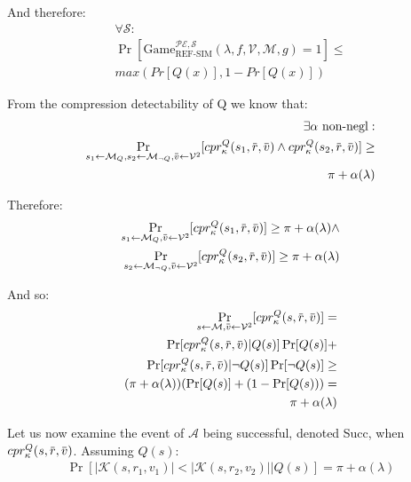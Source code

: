 \documentclass[conference, letterpaper, 10pt]{IEEEtran}
\newcommand{\overbar}[1]{\mkern 1.5mu\overline{\mkern-1.5mu#1\mkern-1.5mu}\mkern 1.5mu}
\begin{document}
\begin{IEEEproof}
And therefore:
\begin{align*}
    \forall \mathcal{S}:\\
    \Pr[
        \text{Game}_{\text{REF-SIM}}^{\mathcal{PE},\mathcal{S}}
        (\lambda, f, \mathcal{V}, \mathcal{M}, g) = 1
    ]
    \leq\\
    max(Pr[Q(x)], 1 - Pr[Q(x)])
\end{align*}

From the compression detectability of Q we know that:
\begin{align*}
    \exists \alpha \text{ non-negl}:\\
    \Pr_{s_1 \leftarrow \mathcal{M}_Q,
         s_2 \leftarrow \mathcal{M}_{\lnot Q},
         \overbar{v} \leftarrow \mathcal{V}^2}
         [cpr^Q_{\kappa}(s_1, \overbar{r}, \overbar{v}) \land
          cpr^Q_{\kappa}(s_2, \overbar{r}, \overbar{v})]
    \geq\\
    \pi + \alpha(\lambda)
\end{align*}

Therefore:
\begin{align*}
    \Pr_{s_1 \leftarrow \mathcal{M}_Q,
         \overbar{v} \leftarrow \mathcal{V}^2}
         [cpr^Q_{\kappa}(s_1, \overbar{r}, \overbar{v})]
    \geq
    \pi + \alpha(\lambda) \land\\
    \Pr_{s_2 \leftarrow \mathcal{M}_{\lnot Q},
         \overbar{v} \leftarrow \mathcal{V}^2}
         [cpr^Q_{\kappa}(s_2, \overbar{r}, \overbar{v})]
    \geq
    \pi + \alpha(\lambda)
\end{align*}

And so:
\begin{align*}
    \Pr_{s \leftarrow \mathcal{M},
         \overbar{v} \leftarrow \mathcal{V}^2}
         [cpr^Q_{\kappa}(s, \overbar{r}, \overbar{v})]
    =\\
    \Pr[cpr^Q_{\kappa}(s, \overbar{r}, \overbar{v})|Q(s)]\Pr[Q(s)]
    +\\
    \Pr[cpr^Q_{\kappa}(s, \overbar{r}, \overbar{v})|\lnot Q(s)]\Pr[\lnot Q(s)]
    \geq\\
    (\pi + \alpha(\lambda))(\Pr[Q(s)] + (1 - \Pr[Q(s)))
    =\\
    \pi + \alpha(\lambda)
\end{align*}

Let us now examine the event of $\mathcal{A}$ being successful, denoted Succ,
when $cpr^Q_{\kappa}(s, \overbar{r}, \overbar{v})$. Assuming $Q(s)$:
\begin{align*}
    \Pr[|\mathcal{K}(s, r_1, v_1)| < |\mathcal{K}(s, r_2, v_2)||Q(s)]
    = \pi + \alpha(\lambda)
\end{align*}


\end{IEEEproof}
\end{document}
